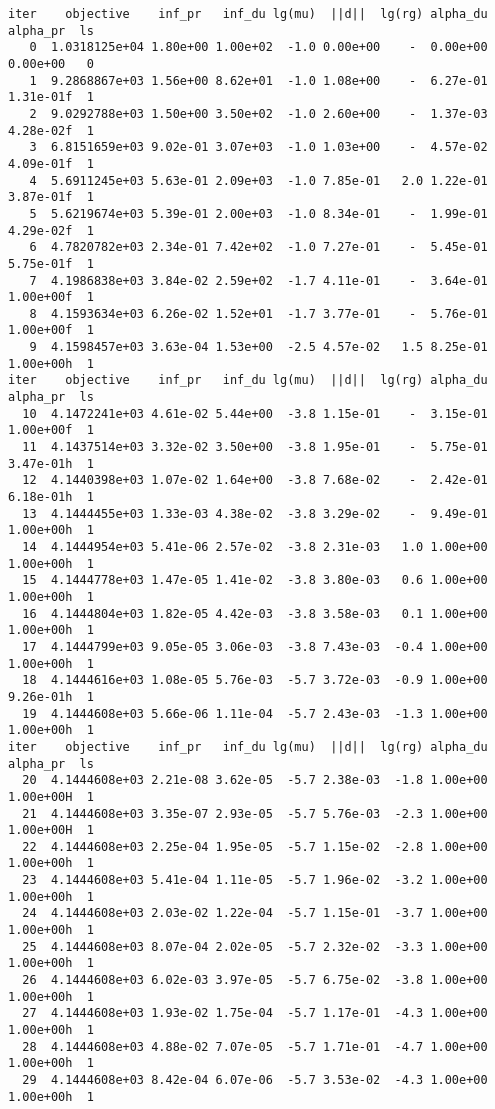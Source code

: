 \begin{lstlisting}
iter    objective    inf_pr   inf_du lg(mu)  ||d||  lg(rg) alpha_du alpha_pr  ls
   0  1.0318125e+04 1.80e+00 1.00e+02  -1.0 0.00e+00    -  0.00e+00 0.00e+00   0
   1  9.2868867e+03 1.56e+00 8.62e+01  -1.0 1.08e+00    -  6.27e-01 1.31e-01f  1
   2  9.0292788e+03 1.50e+00 3.50e+02  -1.0 2.60e+00    -  1.37e-03 4.28e-02f  1
   3  6.8151659e+03 9.02e-01 3.07e+03  -1.0 1.03e+00    -  4.57e-02 4.09e-01f  1
   4  5.6911245e+03 5.63e-01 2.09e+03  -1.0 7.85e-01   2.0 1.22e-01 3.87e-01f  1
   5  5.6219674e+03 5.39e-01 2.00e+03  -1.0 8.34e-01    -  1.99e-01 4.29e-02f  1
   6  4.7820782e+03 2.34e-01 7.42e+02  -1.0 7.27e-01    -  5.45e-01 5.75e-01f  1
   7  4.1986838e+03 3.84e-02 2.59e+02  -1.7 4.11e-01    -  3.64e-01 1.00e+00f  1
   8  4.1593634e+03 6.26e-02 1.52e+01  -1.7 3.77e-01    -  5.76e-01 1.00e+00f  1
   9  4.1598457e+03 3.63e-04 1.53e+00  -2.5 4.57e-02   1.5 8.25e-01 1.00e+00h  1
iter    objective    inf_pr   inf_du lg(mu)  ||d||  lg(rg) alpha_du alpha_pr  ls
  10  4.1472241e+03 4.61e-02 5.44e+00  -3.8 1.15e-01    -  3.15e-01 1.00e+00f  1
  11  4.1437514e+03 3.32e-02 3.50e+00  -3.8 1.95e-01    -  5.75e-01 3.47e-01h  1
  12  4.1440398e+03 1.07e-02 1.64e+00  -3.8 7.68e-02    -  2.42e-01 6.18e-01h  1
  13  4.1444455e+03 1.33e-03 4.38e-02  -3.8 3.29e-02    -  9.49e-01 1.00e+00h  1
  14  4.1444954e+03 5.41e-06 2.57e-02  -3.8 2.31e-03   1.0 1.00e+00 1.00e+00h  1
  15  4.1444778e+03 1.47e-05 1.41e-02  -3.8 3.80e-03   0.6 1.00e+00 1.00e+00h  1
  16  4.1444804e+03 1.82e-05 4.42e-03  -3.8 3.58e-03   0.1 1.00e+00 1.00e+00h  1
  17  4.1444799e+03 9.05e-05 3.06e-03  -3.8 7.43e-03  -0.4 1.00e+00 1.00e+00h  1
  18  4.1444616e+03 1.08e-05 5.76e-03  -5.7 3.72e-03  -0.9 1.00e+00 9.26e-01h  1
  19  4.1444608e+03 5.66e-06 1.11e-04  -5.7 2.43e-03  -1.3 1.00e+00 1.00e+00h  1
iter    objective    inf_pr   inf_du lg(mu)  ||d||  lg(rg) alpha_du alpha_pr  ls
  20  4.1444608e+03 2.21e-08 3.62e-05  -5.7 2.38e-03  -1.8 1.00e+00 1.00e+00H  1
  21  4.1444608e+03 3.35e-07 2.93e-05  -5.7 5.76e-03  -2.3 1.00e+00 1.00e+00H  1
  22  4.1444608e+03 2.25e-04 1.95e-05  -5.7 1.15e-02  -2.8 1.00e+00 1.00e+00h  1
  23  4.1444608e+03 5.41e-04 1.11e-05  -5.7 1.96e-02  -3.2 1.00e+00 1.00e+00h  1
  24  4.1444608e+03 2.03e-02 1.22e-04  -5.7 1.15e-01  -3.7 1.00e+00 1.00e+00h  1
  25  4.1444608e+03 8.07e-04 2.02e-05  -5.7 2.32e-02  -3.3 1.00e+00 1.00e+00h  1
  26  4.1444608e+03 6.02e-03 3.97e-05  -5.7 6.75e-02  -3.8 1.00e+00 1.00e+00h  1
  27  4.1444608e+03 1.93e-02 1.75e-04  -5.7 1.17e-01  -4.3 1.00e+00 1.00e+00h  1
  28  4.1444608e+03 4.88e-02 7.07e-05  -5.7 1.71e-01  -4.7 1.00e+00 1.00e+00h  1
  29  4.1444608e+03 8.42e-04 6.07e-06  -5.7 3.53e-02  -4.3 1.00e+00 1.00e+00h  1

\end{lstlisting}
